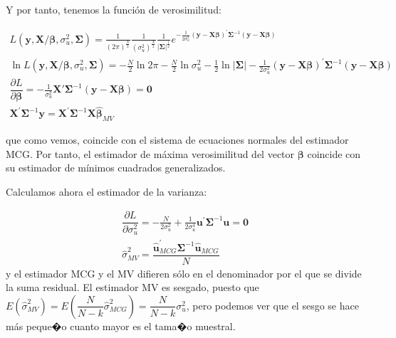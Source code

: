 Y por tanto, tenemos la funci\'on de verosimilitud:

\[
\begin{array}{c}
L\left(\boldsymbol{y},\boldsymbol{X}/\boldsymbol{\beta},\sigma_{u}^{2},\boldsymbol{\Sigma}\right)=\tfrac{1}{\left(2\pi\right)^{\frac{N}{2}}}\tfrac{1}{\left(\sigma_{u}^{2}\right)^{\frac{N}{2}}}\tfrac{1}{\left|\boldsymbol{\Sigma}\right|^{\frac{1}{2}}}e^{-\tfrac{1}{2\sigma_{u}^{2}}\left(\boldsymbol{y}-\boldsymbol{X}\boldsymbol{\beta}\right)^{\prime}\boldsymbol{\Sigma}^{-1}\left(\boldsymbol{y}-\boldsymbol{X}\boldsymbol{\beta}\right)}\\
\ln{L\left(\boldsymbol{y},\boldsymbol{X}/\boldsymbol{\beta},\sigma_{u}^{2},\boldsymbol{\Sigma}\right)}=-\frac{N}{2}\ln{2\pi}-\frac{N}{2}\ln{\sigma_{u}^{2}}-\frac{1}{2}\ln{\left|\boldsymbol{\Sigma}\right|}-\tfrac{1}{2\sigma_{u}^{2}}\left(\boldsymbol{y}-\boldsymbol{X}\boldsymbol{\beta}\right)^{\prime}\boldsymbol{\Sigma}^{-1}\left(\boldsymbol{y}-\boldsymbol{X}\boldsymbol{\beta}\right)\\
\dfrac{\partial L}{\partial\boldsymbol{\beta}}=-\tfrac{1}{\sigma_{u}^{2}}\boldsymbol{X}'\boldsymbol{\Sigma}^{-1}\left(\boldsymbol{y}-\boldsymbol{X}\boldsymbol{\beta}\right)=\boldsymbol{0}\\
\boldsymbol{X}^{\prime}\boldsymbol{\Sigma}^{-1}\boldsymbol{y}=\boldsymbol{X}^{\prime}\boldsymbol{\Sigma}^{-1}\boldsymbol{X}\hat{\boldsymbol{\beta}}_{MV}
\end{array}
\]


que como vemos, coincide con el sistema de ecuaciones normales del
estimador MCG. Por tanto, el estimador de m\'axima verosimilitud del
vector $\boldsymbol{\beta}$ coincide con su estimador de m\'inimos
cuadrados generalizados.

Calculamos ahora el estimador de la varianza:

\[
\begin{array}{c}
\dfrac{\partial L}{\partial\sigma_{u}^{2}}=-\frac{N}{2\sigma_{u}^{2}}+\tfrac{1}{2\sigma_{u}^{4}}\boldsymbol{u}^{\prime}\boldsymbol{\Sigma}^{-1}\boldsymbol{u}=\boldsymbol{0}\\
\hat{\sigma}_{MV}^{2}=\dfrac{\hat{\boldsymbol{u}}_{MCG}^{\prime}\boldsymbol{\Sigma}^{-1}\hat{\boldsymbol{u}}_{MCG}}{N}
\end{array}
\]
 y el estimador MCG y el MV difieren s\'olo en el denominador por el
que se divide la suma residual. El estimador MV es sesgado, puesto
que $E\left(\hat{\sigma}_{MV}^{2}\right)=E\left(\dfrac{N}{N-k}\hat{\sigma}_{MCG}^{2}\right)=\dfrac{N}{N-k}\sigma_{u}^{2}$,
pero podemos ver que el sesgo se hace m\'as peque�o cuanto mayor es
el tama�o muestral.
